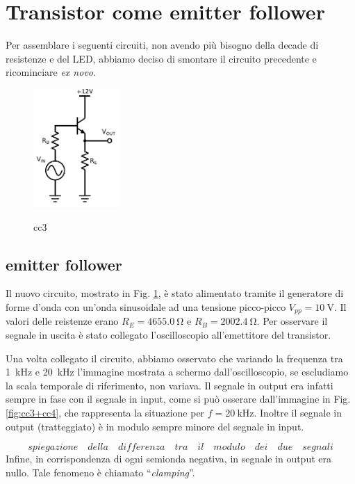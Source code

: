 \section{Transistor come emitter follower}

Per assemblare i seguenti circuiti, non avendo più bisogno della decade di resistenze e del LED, abbiamo deciso di smontare il circuito precedente e ricominciare \emph{ex novo}.

\begin{figure}
	\caption{cc3}
	\includegraphics[height=45mm]{cc3.pdf}
	\label{fig:cc3}
\end{figure}

\subsection{emitter follower}
Il nuovo circuito, mostrato in Fig. \ref{fig:cc3}, è stato alimentato tramite il generatore di forme d'onda con un'onda sinusoidale ad una tensione picco-picco $V_{pp} = \SI{10}{\volt}$.
Il valori delle reistenze erano $R_E = \SI{4655.0}{\ohm}$ e $R_B = \SI{2002.4}{\ohm}$.
Per osservare il segnale in uscita è stato collegato l'oscilloscopio all'emettitore del transistor.

Una volta collegato il circuito, abbiamo osservato che variando la frequenza tra \SI{1}{\kilo\hertz} e \SI{20}{\kilo\hertz} l'immagine mostrata a schermo dall'oscilloscopio, se escludiamo la scala temporale di riferimento, non variava.
Il segnale in output era infatti sempre in fase con il segnale in input, come si può osserare dall'immagine in Fig. \ref{fig:cc3+cc4}, che rappresenta la situazione per $f = \SI{20}{\kilo\hertz}$.
Inoltre il segnale in output (tratteggiato) è in modulo sempre minore del segnale in input.

$$spiegazione \quad della \quad differenza \quad tra \quad il \quad modulo \quad dei \quad due \quad segnali$$
Infine, in corrispondenza di ogni semionda negativa, in segnale in output era nullo.
Tale fenomeno è chiamato ``\emph{clamping}''.

